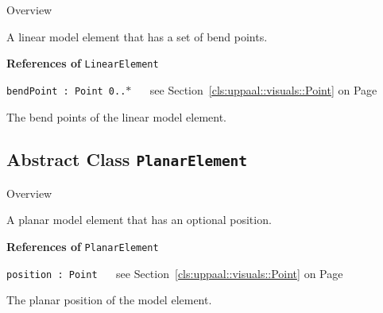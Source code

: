 	\begin{longdescription}
		\item[Overview] 		
				

	

		A linear model element that has a set of bend points.		
		
	
			\item[\textbf{References of} \texttt{LinearElement}] ~
			\begin{longdescription}
	\item[\texttt{bendPoint : Point 	\symbol{"5B}0..$*$\symbol{"5D}
}] ~
	see Section~\ref{cls:uppaal::visuals::Point} on Page~\pageref{cls:uppaal::visuals::Point}
	
	\nopagebreak
		
				

	

		The bend points of the linear model element.		
			\end{longdescription}
	
	\end{longdescription}
	

\subsection{Abstract Class \bfseries \texttt{PlanarElement}\normalfont}
\label{cls:uppaal::visuals::PlanarElement} 
	
	\begin{longdescription}
		\item[Overview] 		
				

	

		A planar model element that has an optional position.		
		
	
			\item[\textbf{References of} \texttt{PlanarElement}] ~
			\begin{longdescription}
	\item[\texttt{position : Point 	}] ~
	see Section~\ref{cls:uppaal::visuals::Point} on Page~\pageref{cls:uppaal::visuals::Point}
	
	\nopagebreak
		
				

	

		The planar position of the model element.		
			\end{longdescription}
	
	\end{longdescription}
	

